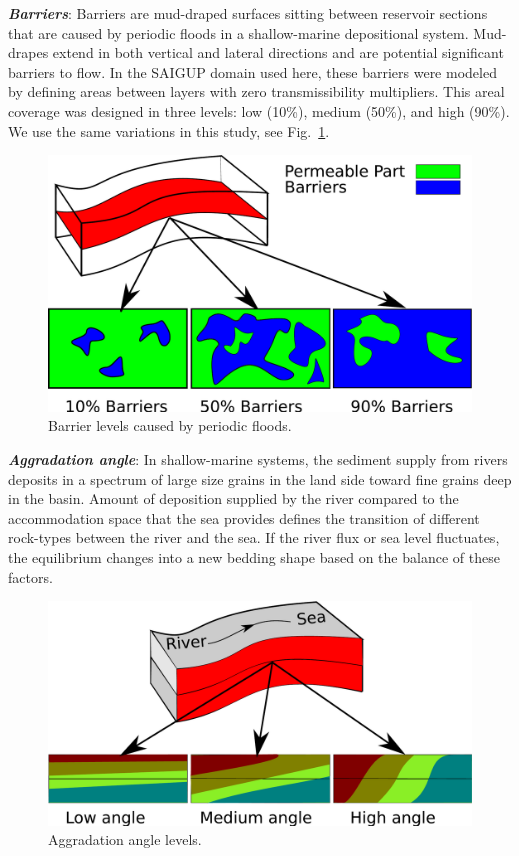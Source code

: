 \textbf{\textit{Barriers}}: 
Barriers are mud-draped surfaces sitting between reservoir sections that are
caused by periodic floods in a shallow-marine depositional system. Mud-drapes
extend in both vertical and lateral directions and are potential significant
barriers to
flow.  In the SAIGUP domain used here, these barriers were modeled by defining
areas between layers with zero transmissibility multipliers. This areal coverage was designed in three levels: low (10\%), medium
(50\%), and high (90\%). We use the same variations in this study, see
Fig.~\ref{fig:barriers}.


\begin{figure}[thb]
  \centering
  \includegraphics[width=0.65 \linewidth]{./figurer/barrier} 
  \caption{Barrier levels caused by periodic floods.}
  \label{fig:barriers}
%
\end{figure}

\textbf{\textit{Aggradation angle}}:
In shallow-marine systems, the sediment supply from rivers deposits in a
spectrum of large size grains in the land side toward fine grains deep in the
basin. Amount of deposition supplied by the river compared to the accommodation
space that the sea provides defines the transition of different rock-types
between the river and the sea. If the river flux or sea level
fluctuates, the equilibrium changes into a new bedding shape based on the
balance of these
factors.

\begin{figure}[thb]
  \centering
  \includegraphics[width=0.65 \linewidth]{./figurer/agr} 
  \caption{Aggradation angle levels.}
  \label{fig:agrLvl}
%
\end{figure}

